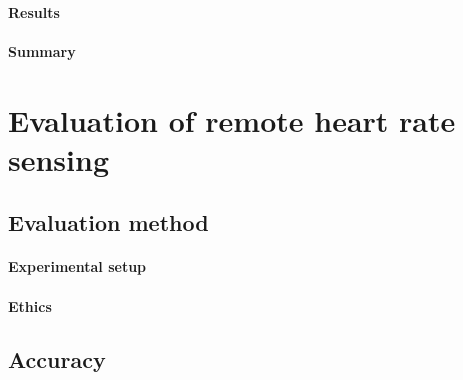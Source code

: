 \paragraph{Results}
\paragraph{Summary}



\section{Evaluation of remote heart rate sensing}
\subsection{Evaluation method}
\paragraph{Experimental setup}
\paragraph{Ethics}
\subsection{Accuracy}

